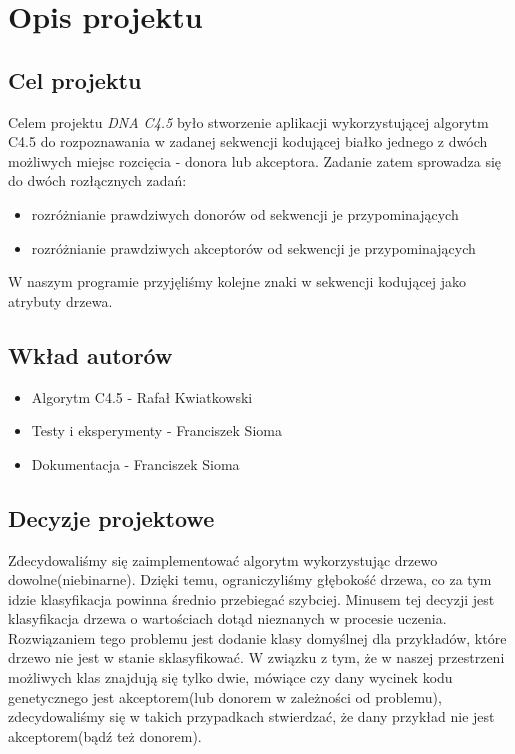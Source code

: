 \section{Opis projektu}
\subsection{Cel projektu}


Celem projektu {\it DNA C4.5} było stworzenie aplikacji wykorzystującej algorytm C4.5 do rozpoznawania w zadanej sekwencji kodującej białko jednego z dwóch możliwych miejsc rozcięcia - donora lub akceptora. Zadanie zatem sprowadza się do dwóch rozłącznych zadań: 
\begin{itemize}
    \item rozróżnianie prawdziwych donorów od sekwencji je przypominających
    \item rozróżnianie prawdziwych akceptorów od sekwencji je przypominających
\end{itemize}

W naszym programie przyjęliśmy kolejne znaki w sekwencji kodującej jako atrybuty drzewa.
\subsection{Wkład autorów}
\begin{itemize}
    \item Algorytm C4.5 - Rafał Kwiatkowski
    \item Testy i eksperymenty - Franciszek Sioma
    \item Dokumentacja - Franciszek Sioma
\end{itemize}
\subsection{Decyzje projektowe}


Zdecydowaliśmy się zaimplementować algorytm wykorzystując drzewo dowolne(niebinarne). Dzięki temu, ograniczyliśmy głębokość drzewa, co za tym idzie klasyfikacja powinna średnio przebiegać szybciej.
Minusem tej decyzji jest klasyfikacja drzewa o wartościach dotąd nieznanych w procesie uczenia. Rozwiązaniem tego problemu jest dodanie klasy domyślnej dla przykładów, które drzewo nie jest w stanie sklasyfikować. W związku z tym, że w naszej przestrzeni możliwych klas znajdują się tylko dwie, mówiące czy dany wycinek kodu genetycznego jest akceptorem(lub donorem w zależności od problemu), zdecydowaliśmy się w takich przypadkach stwierdzać, że dany przykład nie jest akceptorem(bądź też donorem). 

